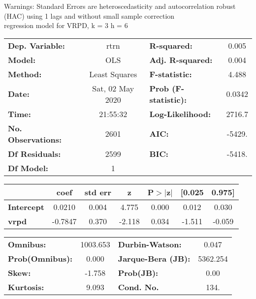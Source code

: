 Warnings: \newline
 [1] Standard Errors are heteroscedasticity and autocorrelation robust (HAC) using 1 lags and without small sample correction\\ 

regression model for VRPD, k = 3 h = 6\begin{center}
\begin{tabular}{lclc}
\toprule
\textbf{Dep. Variable:}    &       rtrn       & \textbf{  R-squared:         } &     0.005   \\
\textbf{Model:}            &       OLS        & \textbf{  Adj. R-squared:    } &     0.004   \\
\textbf{Method:}           &  Least Squares   & \textbf{  F-statistic:       } &     4.488   \\
\textbf{Date:}             & Sat, 02 May 2020 & \textbf{  Prob (F-statistic):} &   0.0342    \\
\textbf{Time:}             &     21:55:32     & \textbf{  Log-Likelihood:    } &    2716.7   \\
\textbf{No. Observations:} &        2601      & \textbf{  AIC:               } &    -5429.   \\
\textbf{Df Residuals:}     &        2599      & \textbf{  BIC:               } &    -5418.   \\
\textbf{Df Model:}         &           1      & \textbf{                     } &             \\
\bottomrule
\end{tabular}
\begin{tabular}{lcccccc}
                   & \textbf{coef} & \textbf{std err} & \textbf{z} & \textbf{P$> |$z$|$} & \textbf{[0.025} & \textbf{0.975]}  \\
\midrule
\textbf{Intercept} &       0.0210  &        0.004     &     4.775  &         0.000        &        0.012    &        0.030     \\
\textbf{vrpd}      &      -0.7847  &        0.370     &    -2.118  &         0.034        &       -1.511    &       -0.059     \\
\bottomrule
\end{tabular}
\begin{tabular}{lclc}
\textbf{Omnibus:}       & 1003.653 & \textbf{  Durbin-Watson:     } &    0.047  \\
\textbf{Prob(Omnibus):} &   0.000  & \textbf{  Jarque-Bera (JB):  } & 5362.254  \\
\textbf{Skew:}          &  -1.758  & \textbf{  Prob(JB):          } &     0.00  \\
\textbf{Kurtosis:}      &   9.093  & \textbf{  Cond. No.          } &     134.  \\
\bottomrule
\end{tabular}
\end{center}

